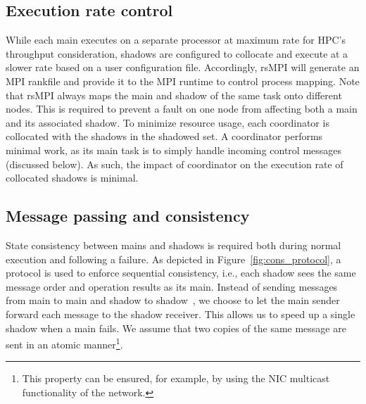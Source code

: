 \subsection{Execution rate control}
\label{sec:rate_control}
While each main executes on a separate processor at maximum rate for HPC's throughput consideration, shadows are configured to collocate and execute at a slower rate based on a user configuration file. Accordingly, rsMPI will generate an MPI rankfile and provide it to the MPI runtime to control process mapping. Note that rsMPI always maps the main and shadow of the same task onto different nodes. This is required to prevent a fault on one node from affecting  both a main and its associated  shadow.
To minimize resource usage, each coordinator is collocated with the shadows in the shadowed set. 
A coordinator performs  minimal work, as its main task is to simply handle incoming control messages (discussed below).  As such, the impact of coordinator on the execution rate of collocated shadows is minimal.



\subsection{Message passing and consistency}
State consistency between mains and shadows is required both during normal execution and following a failure. %
As depicted in Figure~\ref{fig:cons_protocol}, a protocol is used 
to enforce sequential consistency, i.e., each shadow sees the same message order and operation results as its main. 
Instead of sending messages from main to main and shadow to shadow~\cite{ferreira_sc_2011}, we choose to let the main sender forward each message to the shadow receiver. This allows us to speed up a single shadow when a main fails. 
We assume that two copies of the same message are sent in an atomic manner\footnote{This property can be ensured, for example, by using the NIC multicast functionality of the network.}.

